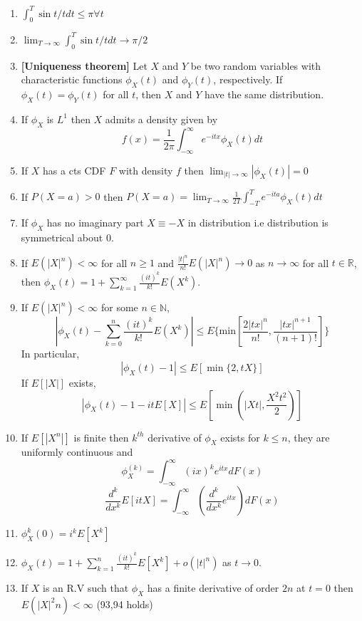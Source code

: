 \documentclass[12pt,oneside]{book}
\begin{document}
\begin{enumerate}
\item $\int_0^T\sin t/tdt\leq \pi\forall t$
\item $\lim_{T\to\infty}\int_0^T \sin t/tdt\to\pi/2$
\item \textbf{[Uniqueness theorem]}  Let $X$ and $Y$ be two random variables with characteristic functions $\phi_X(t)$ and $\phi_Y(t)$, respectively. If $\phi_X(t) = \phi_Y(t)$ for all $t$, then $X$ and $Y$ have the same distribution. 
\item If $\phi_X$ is $L^1$ then $X$ admits a density given by $$f(x)=\frac{1}{2\pi}\int_{-\infty}^\infty e^{-itx}\phi_X(t)dt$$
\item If $X$ has a cts CDF $F$ with density $f$ then $\lim_{|t|\to\infty}|\phi_X(t)|=0$
\item If $P(X=a)>0$ then $P(X=a)=\lim_{T\to\infty}\frac{1}{2T}\int_{-T}^Te^{-ita}\phi_X(t)dt$
\item If $\phi_X$ has no imaginary part $X\equiv -X$ in distribution i.e distribution is symmetrical about 0. 
\item If $E(|X|^n)<\infty$ for all $n\geq 1$ and $\frac{|t|^n}{n!}E(|X|^n)\rightarrow 0$ as $n\rightarrow\infty$ for all $t\in\mathbb{R}$, then $\phi_X(t)=1+\sum_{k=1}^\infty\frac{(it)^k}{k!}E(X^k)$.
\item If $E(|X|^n)<\infty$ for some $n\in\mathbb{N}$,
\[
|\phi_X(t)-\sum_{k=0}^n\frac{(it)^k}{k!}E(X^k)|\leq E\{\mathrm{min}[\frac{2|tx|^n}{n!}, \frac{|tx|^{n+1}}{(n+1)!}]\}
\]
In particular, $$|\phi_X(t)-1|\leq E[\min\{2,tX\}]$$
If $E[|X|]$ exists, 
$$|\phi_X(t)-1-it E[X]|\leq E\left[\min\left(|Xt|,\frac{X^2t^2}{2}\right)\right]$$
\item If $E[|X^n|]$ is finite then $k^{th}$ derivative of $\phi_X$ exists for $k\leq n$, they are uniformly continuous and $$\phi_X^{(k)}=\int_{-\infty}^\infty(ix)^ke^{itx}dF(x)$$
$$\frac{d^k}{dx^k}E[itX]=\int_{-\infty}^\infty\left(\frac{d^k}{dx^k}e^{itx}\right)dF(x)$$
\item $\phi_X^k(0)=i^kE[X^k]$
\item $\phi_X(t)=1+\sum_{k=1}^n\frac{(it)^k}{k!}E[X^k]+o(|t|^n)$ as $t\to0$.
\item If $X$ is an R.V such that $\phi_X$ has a finite derivative of order $2n$ at $t=0$ then $E(|X|^2n)<\infty$ (93,94 holds)
 

\end{enumerate}
\end{document}
